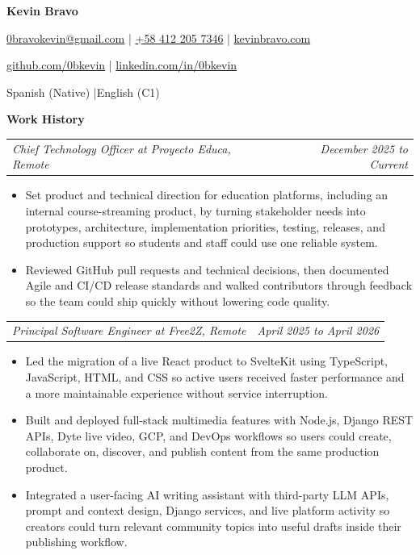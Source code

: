 \documentclass[10pt,letterpaper]{article}
\makeatletter
\newcommand{\bodyfont}{\fontsize{10.5}{15.75}\selectfont}
\newcommand{\contactfont}{\fontsize{11.5}{14.5}\selectfont}
\newcommand{\sectiontitle}[1]{%
  \vspace{6pt}
  {\bodyfont\textbf{#1}}\par
  \nopagebreak[4]
  \vspace{4pt}
}
\newcommand{\roleline}[2]{%
  \begin{tabularx}{\textwidth}{@{}Xr@{}}
    \bodyfont\textit{#1} & \bodyfont\textit{#2}
  \end{tabularx}
  \nopagebreak[4]
  \vspace{1pt}
}
\makeatother
\begin{document}
\bodyfont

\begin{center}
  {\fontsize{14}{17}\selectfont\textbf{Kevin Bravo}}\par
  \vspace{3pt}
  {\contactfont
    \href{mailto:0bravokevin@gmail.com}{0bravokevin@gmail.com}
    \enspace|\enspace
    \href{tel:+584122057346}{+58 412 205 7346}
    \enspace|\enspace
    \href{https://kevinbravo.com}{kevinbravo.com}
  }\par
  {\contactfont
    \href{https://github.com/0bkevin}{github.com/0bkevin}
    \enspace|\enspace
    \href{https://www.linkedin.com/in/0bkevin/}{linkedin.com/in/0bkevin}
  }\par
  {\contactfont Spanish (Native) \enspace|\enspace English (C1)}
\end{center}

\sectiontitle{Work History}

\roleline{Chief Technology Officer at Proyecto Educa, Remote}{December 2025 to Current}
\begin{itemize}
  \item Set product and technical direction for education platforms, including an internal course-streaming product, by turning stakeholder needs into prototypes, architecture, implementation priorities, testing, releases, and production support so students and staff could use one reliable system.
  \item Reviewed GitHub pull requests and technical decisions, then documented Agile and CI/CD release standards and walked contributors through feedback so the team could ship quickly without lowering code quality.
\end{itemize}

\vspace{3pt}
\roleline{Principal Software Engineer at Free2Z, Remote}{April 2025 to April 2026}
\begin{itemize}
  \item Led the migration of a live React product to SvelteKit using TypeScript, JavaScript, HTML, and CSS so active users received faster performance and a more maintainable experience without service interruption.
  \item Built and deployed full-stack multimedia features with Node.js, Django REST APIs, Dyte live video, GCP, and DevOps workflows so users could create, collaborate on, discover, and publish content from the same production product.
  \item Integrated a user-facing AI writing assistant with third-party LLM APIs, prompt and context design, Django services, and live platform activity so creators could turn relevant community topics into useful drafts inside their publishing workflow.
\end{itemize}
\end{document}
